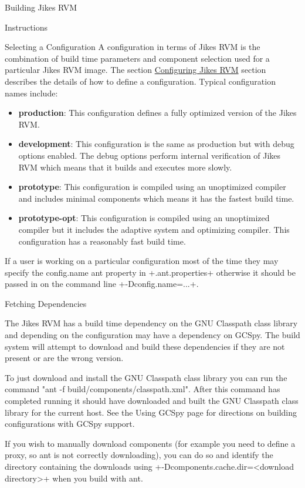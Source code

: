 \begin{section}{Building Jikes RVM}
\begin{subsection}{Instructions}
\begin{subsubsection}{Selecting a Configuration}
A configuration in terms of Jikes RVM is the combination of build time parameters and component selection used for a particular Jikes RVM image. The section \hyperref[sec:configuringjikesrvm]{Configuring Jikes RVM} section describes the details of how to define a configuration. Typical configuration names include:
\begin{itemize}
  \item \textbf{production}: This configuration defines a fully optimized version of the Jikes RVM.
  \item \textbf{development}: This configuration is the same as production but with debug options enabled. The debug options perform internal verification of Jikes RVM which means that it builds and executes more slowly.
  \item \textbf{prototype}: This configuration is compiled using an unoptimized compiler and includes minimal components which means it has the fastest build time.
  \item \textbf{prototype-opt}: This configuration is compiled using an unoptimized compiler but it includes the adaptive system and optimizing compiler. This configuration has a reasonably fast build time.
\end{itemize}

If a user is working on a particular configuration most of the time they may specify the config.name ant property in \spverb+.ant.properties+ otherwise it should be passed in on the command line \spverb+-Dconfig.name=...+.

\end{subsubsection}

\begin{subsubsection}{Fetching Dependencies}

The Jikes RVM has a build time dependency on the GNU Classpath class library and depending on the configuration may have a dependency on GCSpy. The build system will attempt to download and build these dependencies if they are not present or are the wrong version.

To just download and install the GNU Classpath class library you can run the command "ant -f build/components/classpath.xml". After this command has completed running it should have downloaded and built the GNU Classpath class library for the current host. See the Using GCSpy page for directions on building configurations with GCSpy support.

If you wish to manually download components (for example you need to define a proxy, so ant is not correctly downloading), you can do so and identify the directory containing the downloads using \spverb+-Dcomponents.cache.dir=<download directory>+ when you build with ant.


\end{subsubsection}
\end{subsection}
\end{section}
